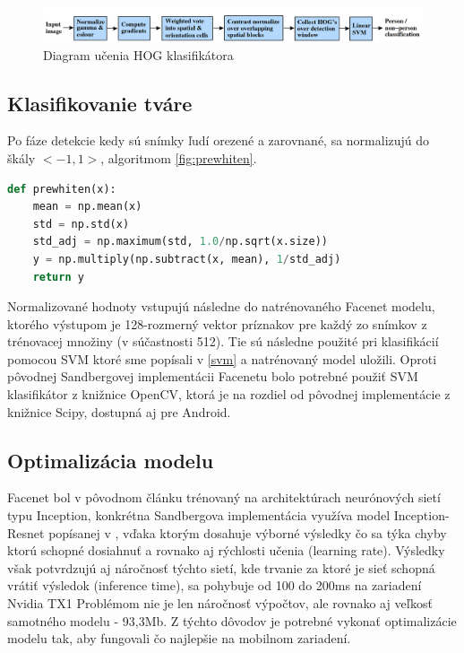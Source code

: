 \begin{figure}[H]
	\centering
	\includegraphics[width=1\linewidth]{img/hog_class}
	\caption{Diagram učenia HOG klasifikátora \cite[s.~3]{dalal2005histograms}}
	\label{fig:hog_class}
\end{figure}

\subsection{Klasifikovanie tváre}
Po fáze detekcie kedy sú snímky ľudí orezené a zarovnané, sa normalizujú do škály $ <-1, 1> $, algoritmom \ref{fig:prewhiten}.

\begin{lstlisting}[language=Python, label={fig:prewhiten}, caption={Normalizácia tváre}]
def prewhiten(x):
	mean = np.mean(x)
	std = np.std(x)
	std_adj = np.maximum(std, 1.0/np.sqrt(x.size))
	y = np.multiply(np.subtract(x, mean), 1/std_adj)
	return y
\end{lstlisting}

Normalizované hodnoty vstupujú následne do natrénovaného Facenet modelu, ktorého výstupom je 128-rozmerný vektor príznakov pre každý zo snímkov z trénovacej množiny (v súčastnosti 512).
Tie sú následne použité pri klasifikácií pomocou SVM ktoré sme popísali v \ref{svm} a natrénovaný model uložili.
Oproti pôvodnej Sandbergovej implementácii Facenetu bolo potrebné použiť SVM klasifikátor z knižnice OpenCV, ktorá je na rozdiel od pôvodnej implementácie z knižnice Scipy, dostupná aj pre Android.

\subsection{Optimalizácia modelu}
Facenet bol v pôvodnom článku \cite{schroff2015facenet} trénovaný na architektúrach neurónových sietí typu Inception, konkrétna Sandbergova implementácia využíva model Inception-Resnet popísanej v \cite{SzegedyIV16}, vďaka ktorým dosahuje výborné výsledky čo sa týka chyby ktorú schopné dosiahnuť a rovnako aj rýchlosti učenia (learning rate).
Výsledky \cite{canziani2016analysis} však potvrdzujú aj náročnosť týchto sietí, kde trvanie za ktoré je sieť schopná vrátiť výsledok (inference time), sa pohybuje od 100 do 200ms na zariadení Nvidia TX1
Problémom nie je len náročnosť výpočtov, ale rovnako aj veľkosť samotného modelu - 93,3Mb.
Z týchto dôvodov je potrebné vykonať optimalizácie modelu tak, aby fungovali čo najlepšie na mobilnom zariadení. \\

